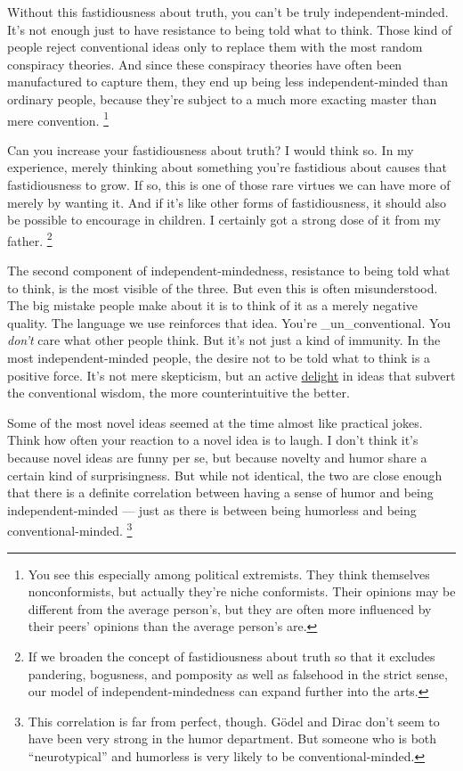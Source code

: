 \documentclass[12pt]{book}
\begin{document}
Without this fastidiousness about truth, you can't be truly
independent-minded. It's not enough just to have resistance to being
told what to think. Those kind of people reject conventional ideas only
to replace them with the most random conspiracy theories. And since
these conspiracy theories have often been manufactured to capture them,
they end up being less independent-minded than ordinary people, because
they're subject to a much more exacting master than mere convention.
\footnote{You see this especially among political extremists. They think
themselves nonconformists, but actually they're niche conformists. Their
opinions may be different from the average person's, but they are often
more influenced by their peers' opinions than the average person's are.}

Can you increase your fastidiousness about truth? I would think so. In
my experience, merely thinking about something you're fastidious about
causes that fastidiousness to grow. If so, this is one of those rare
virtues we can have more of merely by wanting it. And if it's like other
forms of fastidiousness, it should also be possible to encourage in
children. I certainly got a strong dose of it from my father.
\footnote{If we broaden the concept of fastidiousness about truth so that
it excludes pandering, bogusness, and pomposity as well as falsehood in
the strict sense, our model of independent-mindedness can expand further
into the arts.}

The second component of independent-mindedness, resistance to being told
what to think, is the most visible of the three. But even this is often
misunderstood. The big mistake people make about it is to think of it as
a merely negative quality. The language we use reinforces that idea.
You're \_un\_conventional. You \emph{don't} care what other people
think. But it's not just a kind of immunity. In the most
independent-minded people, the desire not to be told what to think is a
positive force. It's not mere skepticism, but an active
\href{gba.html}{delight} in ideas that subvert the conventional wisdom,
the more counterintuitive the better.

Some of the most novel ideas seemed at the time almost like practical
jokes. Think how often your reaction to a novel idea is to laugh. I
don't think it's because novel ideas are funny per se, but because
novelty and humor share a certain kind of surprisingness. But while not
identical, the two are close enough that there is a definite correlation
between having a sense of humor and being independent-minded --- just as
there is between being humorless and being conventional-minded.
\footnote{This correlation is far from perfect, though. Gödel and Dirac
don't seem to have been very strong in the humor department. But someone
who is both ``neurotypical'' and humorless is very likely to be
conventional-minded.}
\end{document}
